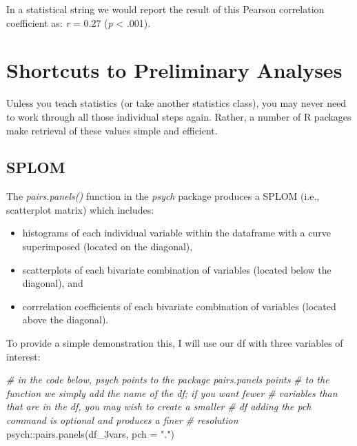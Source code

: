 \documentclass[
  11pt,
]{book}
\newenvironment{Shaded}{\begin{snugshade}}{\end{snugshade}}
\newcommand{\AttributeTok}[1]{\textcolor[rgb]{0.77,0.63,0.00}{#1}}
\newcommand{\CommentTok}[1]{\textcolor[rgb]{0.56,0.35,0.01}{\textit{#1}}}
\newcommand{\FunctionTok}[1]{\textcolor[rgb]{0.00,0.00,0.00}{#1}}
\newcommand{\NormalTok}[1]{#1}
\newcommand{\SpecialCharTok}[1]{\textcolor[rgb]{0.00,0.00,0.00}{#1}}
\newcommand{\StringTok}[1]{\textcolor[rgb]{0.31,0.60,0.02}{#1}}
\providecommand{\tightlist}{%
  \setlength{\itemsep}{0pt}\setlength{\parskip}{0pt}}
\begin{document}
In a statistical string we would report the result of this Pearson correlation coefficient as: \emph{r} = 0.27 (\emph{p} \textless{} .001).

\hypertarget{shortcuts-to-preliminary-analyses}{%
\section{Shortcuts to Preliminary Analyses}\label{shortcuts-to-preliminary-analyses}}

Unless you teach statistics (or take another statistics class), you may never need to work through all those individual steps again. Rather, a number of R packages make retrieval of these values simple and efficient.

\hypertarget{splom}{%
\subsection{SPLOM}\label{splom}}

The \emph{pairs.panels()} function in the \emph{psych} package produces a SPLOM (i.e., scatterplot matrix) which includes:

\begin{itemize}
\tightlist
\item
  histograms of each individual variable within the dataframe with a curve superimposed (located on the diagonal),
\item
  scatterplots of each bivariate combination of variables (located below the diagonal), and
\item
  corrrelation coefficients of each bivariate combination of variables (located above the diagonal).
\end{itemize}

To provide a simple demonstration this, I will use our df with three variables of interest:

\begin{Shaded}
\begin{Highlighting}[]
\CommentTok{\# in the code below, psych points to the package pairs.panels points}
\CommentTok{\# to the function we simply add the name of the df; if you want fewer}
\CommentTok{\# variables than that are in the df, you may wish to create a smaller}
\CommentTok{\# df adding the pch command is optional and produces a finer}
\CommentTok{\# resolution}
\NormalTok{psych}\SpecialCharTok{::}\FunctionTok{pairs.panels}\NormalTok{(df\_3vars, }\AttributeTok{pch =} \StringTok{"."}\NormalTok{)}
\end{Highlighting}
\end{Shaded}
\end{document}
